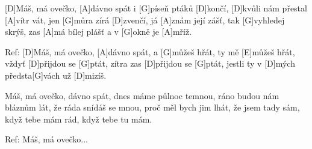 
[D]Máš, má ovečko, [A]dávno spát i [G]píseň ptáků [D]končí,
[D]kvůli nám přestal [A]vítr vát, jen [G]můra zírá [D]zvenčí,
já [A]znám její zášť, tak [G]vyhledej skrýš,
zas [A]má bílej plášť a v [G]okně je [A]mříž.

Ref:
[D]Máš, má ovečko, [A]dávno spát,
a [G]můžeš hřát, ty mě [E]můžeš hřát,
vždyť [D]přijdou se [G]ptát,
zítra zas [D]přijdou se [G]ptát,
jestli ty v [D]mých předsta[G]vách už [D]mizíš.

Máš, má ovečko, dávno spát, dnes máme půlnoc temnou,
ráno budou nám bláznům lát, že ráda snídáš se mnou,
proč měl bych jim lhát, že jsem tady sám,
když tebe mám rád, když tebe tu mám.

Ref: Máš, má ovečko...